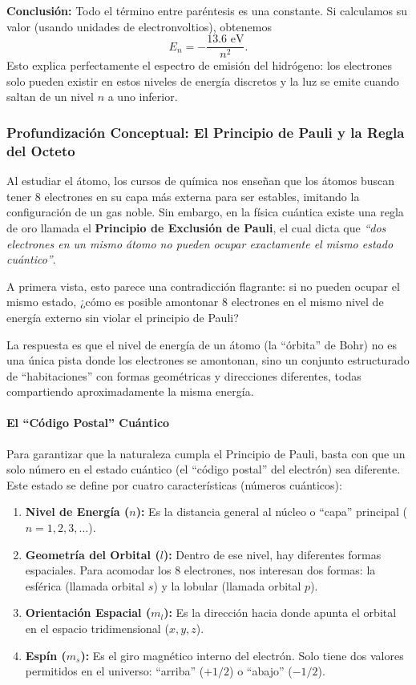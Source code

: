 \documentclass[11pt,a4paper]{book}
\begin{document}
\textbf{Conclusión:}
Todo el término entre paréntesis es una constante. Si calculamos su valor (usando unidades de electronvoltios), obtenemos
\begin{equation}
    E_n = - \frac{13.6 \text{ eV}}{n^2}.
\end{equation}
Esto explica perfectamente el espectro de emisión del hidrógeno: los electrones solo pueden existir en estos niveles de energía discretos y la luz se emite cuando saltan de un nivel $n$ a uno inferior.

\subsubsection{Profundización Conceptual: El Principio de Pauli y la Regla del Octeto}

Al estudiar el átomo, los cursos de química nos enseñan que los átomos buscan tener $8$ electrones en su capa más externa para ser estables, imitando la configuración de un gas noble. Sin embargo, en la física cuántica existe una regla de oro llamada el \textbf{Principio de Exclusión de Pauli}, el cual dicta que \textit{``dos electrones en un mismo átomo no pueden ocupar exactamente el mismo estado cuántico''}. 

A primera vista, esto parece una contradicción flagrante: si no pueden ocupar el mismo estado, ¿cómo es posible amontonar $8$ electrones en el mismo nivel de energía externo sin violar el principio de Pauli?

La respuesta es que el nivel de energía de un átomo (la ``órbita'' de Bohr) no es una única pista donde los electrones se amontonan, sino un conjunto estructurado de ``habitaciones'' con formas geométricas y direcciones diferentes, todas compartiendo aproximadamente la misma energía.

\paragraph{El ``Código Postal'' Cuántico}
Para garantizar que la naturaleza cumpla el Principio de Pauli, basta con que un solo número en el estado cuántico (el ``código postal'' del electrón) sea diferente. Este estado se define por cuatro características (números cuánticos):
\begin{enumerate}
    \item \textbf{Nivel de Energía ($n$):} Es la distancia general al núcleo o ``capa'' principal ($n=1, 2, 3, \dots$).
    \item \textbf{Geometría del Orbital ($l$):} Dentro de ese nivel, hay diferentes formas espaciales. Para acomodar los 8 electrones, nos interesan dos formas: la esférica (llamada orbital $s$) y la lobular (llamada orbital $p$).
    \item \textbf{Orientación Espacial ($m_l$):} Es la dirección hacia donde apunta el orbital en el espacio tridimensional ($x, y, z$).
    \item \textbf{Espín ($m_s$):} Es el giro magnético interno del electrón. Solo tiene dos valores permitidos en el universo: ``arriba'' ($+1/2$) o ``abajo'' ($-1/2$).
\end{enumerate}
\end{document}
